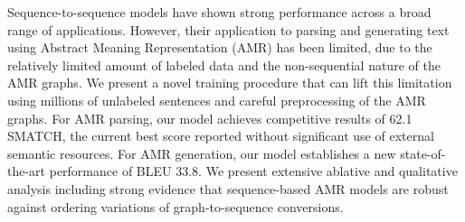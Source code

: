 Sequence-to-sequence models have shown strong performance across a broad range of applications. However, their application to parsing and generating text using Abstract Meaning Representation (AMR) has been limited, due to the relatively limited amount of labeled data and the non-sequential nature of the AMR graphs. We present a novel training procedure that can lift this limitation using millions of unlabeled sentences and careful preprocessing of the AMR graphs. For AMR parsing, our model achieves competitive results of 62.1 SMATCH, the current best score reported without significant use of external semantic resources. For AMR generation, our model establishes a new state-of-the-art performance of BLEU 33.8. We present extensive ablative and qualitative analysis including strong evidence that sequence-based AMR models are robust against ordering variations of graph-to-sequence conversions.
